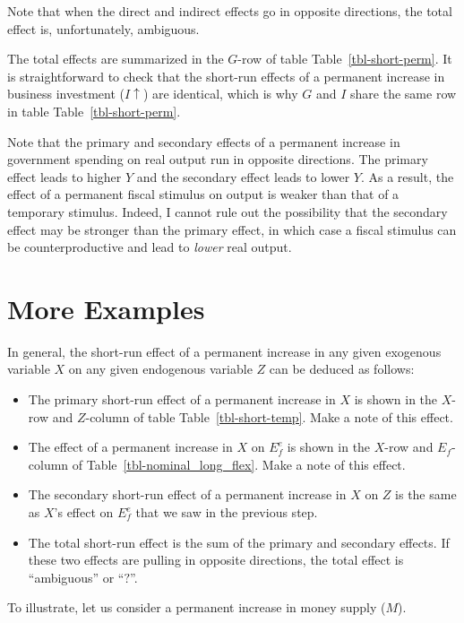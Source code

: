 \documentclass[
  letterpaper,
]{book}
\providecommand{\tightlist}{%
  \setlength{\itemsep}{0pt}\setlength{\parskip}{0pt}}\usepackage{longtable,booktabs,array}
\theoremstyle{plain}
\theoremstyle{remark}
\begin{document}
Note that when the direct and indirect effects go in opposite
directions, the total effect is, unfortunately, ambiguous.

The total effects are summarized in the \(G\)-row of table
Table~\ref{tbl-short-perm}. It is straightforward to check that the
short-run effects of a permanent increase in business investment
(\(I\uparrow\)) are identical, which is why \(G\) and \(I\) share the
same row in table Table~\ref{tbl-short-perm}.

Note that the primary and secondary effects of a permanent increase in
government spending on real output run in opposite directions. The
primary effect leads to higher \(Y\) and the secondary effect leads to
lower \(Y\). As a result, the effect of a permanent fiscal stimulus on
output is weaker than that of a temporary stimulus. Indeed, I cannot
rule out the possibility that the secondary effect may be stronger than
the primary effect, in which case a fiscal stimulus can be
counterproductive and lead to \emph{lower} real output.

\section{More Examples}\label{sec-short-perm-effect-examples}

In general, the short-run effect of a permanent increase in any given
exogenous variable \(X\) on any given endogenous variable \(Z\) can be
deduced as follows:

\begin{itemize}
\tightlist
\item
  The primary short-run effect of a permanent increase in \(X\) is shown
  in the \(X\)-row and \(Z\)-column of table Table~\ref{tbl-short-temp}.
  Make a note of this effect.
\item
  The effect of a permanent increase in \(X\) on \(E_f^e\) is shown in
  the \(X\)-row and \(E_f\)-column of Table~\ref{tbl-nominal_long_flex}.
  Make a note of this effect.
\item
  The secondary short-run effect of a permanent increase in \(X\) on
  \(Z\) is the same as \(X\)'s effect on \(E_f^e\) that we saw in the
  previous step.
\item
  The total short-run effect is the sum of the primary and secondary
  effects. If these two effects are pulling in opposite directions, the
  total effect is ``ambiguous'' or ``\(?\)''.
\end{itemize}

To illustrate, let us consider a permanent increase in money supply
(\(M\)).
\end{document}

